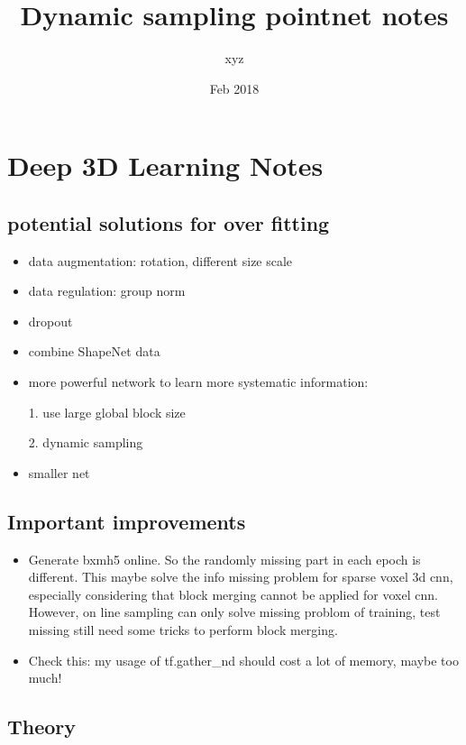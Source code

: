 \documentclass{article}
\title{Dynamic sampling pointnet notes}
\author{xyz}
\date{Feb 2018}
\begin{document}
\begin{titlepage}
\maketitle
\end{titlepage}	

\tableofcontents{}

\section{Deep 3D Learning Notes}

\subsection{potential solutions for over fitting}
\begin{itemize}
	\item data augmentation: rotation, different size scale
	\item data regulation: group norm
	\item dropout
	\item combine ShapeNet data
	\item more powerful network to learn more systematic information:\par
	1. use large global block size\par
	2. dynamic sampling
	\item smaller net
\end{itemize}

\subsection{Important improvements}
\begin{itemize}
	\item Generate bxmh5 online. So the randomly missing part in each epoch is different. This maybe solve the info missing problem for sparse voxel 3d cnn, especially considering that block merging cannot be applied for voxel cnn. However, on line sampling can only solve missing problom of training, test missing still need some tricks to perform block merging.
	\item Check this: my usage of tf.gather\_nd should cost a lot of memory, maybe too much!
\end{itemize}

\subsection{Theory}
\end{document}
